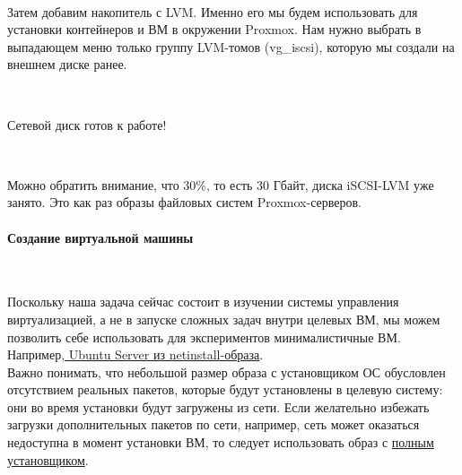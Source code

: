 \documentclass[14pt, a4paper]{article}
\begin{document}
\begin{figure}[h]
    \centering
    \\
    \label{framework} 
\end{figure}

Затем добавим накопитель с LVM. Именно его мы будем использовать для установки контейнеров и
ВМ в окружении Proxmox. Нам нужно выбрать в выпадающем меню только группу LVM-томов
(vg\_iscsi), которую мы создали на внешнем диске ранее.

\newpage

\begin{figure}[h]
    \centering
    \\
    \label{framework} 
\end{figure}

Сетевой диск готов к работе!

\begin{figure}[h]
    \centering
    \\
    \label{framework} 
\end{figure}

Можно обратить внимание, что 30\%, то есть 30 Гбайт, диска iSCSI-LVM уже занято. Это как раз
образы файловых систем Proxmox-серверов.

\paragraph*{Создание виртуальной машины} \mbox{}\\

Поскольку наша задача сейчас состоит в изучении системы управления виртуализацией, а не в
запуске сложных задач внутри целевых ВМ, мы можем позволить себе использовать для
экспериментов минималистичные ВМ. Например,\href{https://help.ubuntu.com/community/Installation/MinimalCD}{ Ubuntu Server из netinstall-образа}.\\

Важно понимать, что небольшой размер образа с установщиком ОС обусловлен отсутствием
реальных пакетов, которые будут установлены в целевую систему: они во время установки будут
загружены из сети. Если желательно избежать загрузки дополнительных пакетов по сети, например,
сеть может оказаться недоступна в момент установки ВМ, то следует использовать образ с 
\href{https://ubuntu.com/download/server}{полным установщиком}.\\
\end{document}
